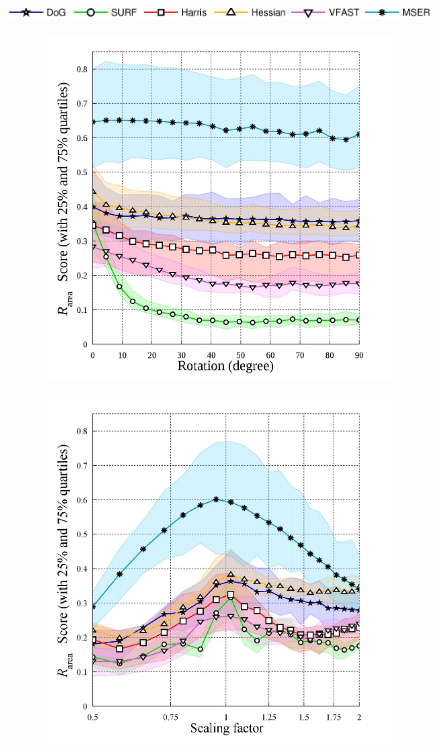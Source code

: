 \begin{figure}[ht]
	\centering 
	\includegraphics[width=0.70\linewidth]{./fig/eval/hlegend.jpg}
	\begin{subfigure}[t]{0.49\linewidth}
		\centering 
		\includegraphics[width=1\linewidth]{./fig/eval/graph_rotation.jpg}
		\label{fig/eval/graph_rotation}
	\end{subfigure}
	\begin{subfigure}[t]{0.49\linewidth}
		\centering 
		\includegraphics[width=1\linewidth]{./fig/eval/graph_scaling_new.jpg}

\end{subfigure}
\end{figure}
